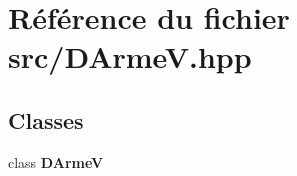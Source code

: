 \section{Référence du fichier src/\-D\-Arme\-V.hpp}
\label{_d_arme_v_8hpp}
\subsection*{Classes}
\begin{DoxyCompactItemize}
\item 
class {\bf D\-Arme\-V}
\end{DoxyCompactItemize}
